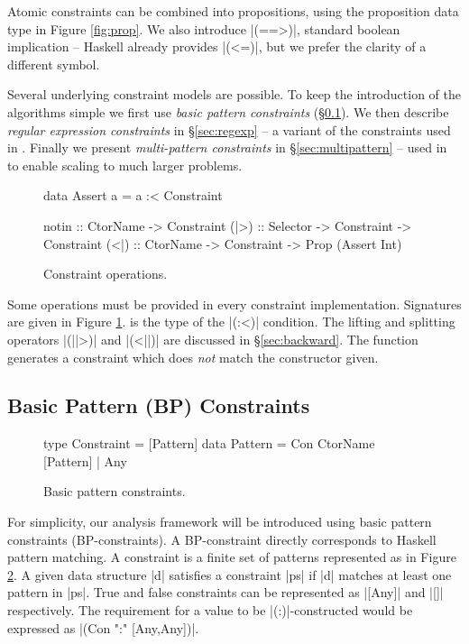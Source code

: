 Atomic constraints can be combined into propositions, using the proposition data type in Figure \ref{fig:prop}. We also introduce |(==>)|, standard boolean implication -- Haskell already provides |(<=)|, but we prefer the clarity of a different symbol.

Several underlying constraint models are possible. To keep the introduction of the algorithms simple we first use \textit{basic pattern constraints} (\S\ref{sec:basic}). We then describe \textit{regular expression constraints} in \S\ref{sec:regexp} -- a variant of the constraints used in \oldtool{}. Finally we present \textit{multi-pattern constraints} in \S\ref{sec:multipattern} -- used in \newtool{} to enable scaling to much larger problems.

\begin{figure}
\begin{code}
data Assert a = a :< Constraint

notin :: CtorName -> Constraint
(|>) :: Selector -> Constraint -> Constraint
(<|) :: CtorName -> Constraint -> Prop (Assert Int)
\end{code}
\caption{Constraint operations.}
\label{fig:constraint}
\figureend
\end{figure}

Some operations must be provided in every constraint implementation. Signatures are given in Figure \ref{fig:constraint}.  is the type of the |(:<)| condition. The lifting and splitting operators |(||>)| and |(<||)| are discussed in \S\ref{sec:backward}. The  function generates a constraint which does \textit{not} match the constructor given.


\subsection{Basic Pattern (BP) Constraints}
\label{sec:basic}

\begin{figure}
\begin{code}
type Constraint  =  [Pattern]
data Pattern     =  Con CtorName [Pattern] | Any
\end{code}
\caption{Basic pattern constraints.}
\label{fig:basic}
\figureend
\end{figure}

For simplicity, our analysis framework will be introduced using basic pattern constraints (BP-constraints). A BP-constraint directly corresponds to Haskell pattern matching. A constraint is a finite set of patterns represented as in Figure \ref{fig:basic}. A given data structure |d| satisfies a constraint |ps| if |d| matches at least one pattern in |ps|. True and false constraints can be represented as |[Any]| and |[]| respectively. The requirement for a value to be |(:)|-constructed would be expressed as |(Con ":" [Any,Any])|.

